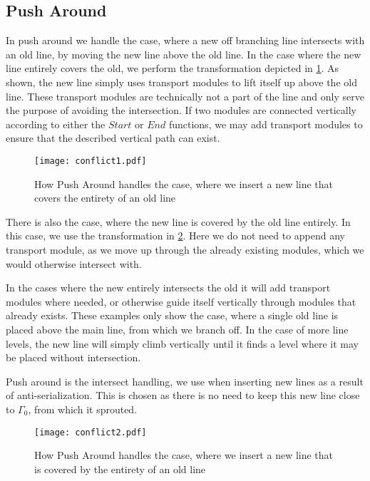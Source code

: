 \subsection{Push Around} \label{ssec:paround}
In push around we handle the case, where a new off branching line intersects with an old line, by moving the new line above the old line. In the case where the new line entirely covers the old, we perform the transformation depicted in \cref{fig:pusharound1}. As shown, the new line simply uses transport modules to lift itself up above the old line. These transport modules are technically not a part of the line and only serve the purpose of avoiding the intersection. If two modules are connected vertically according to either the $Start$ or $End$ functions, we may add transport modules to ensure that the described vertical path can exist.

\begin{figure}[h]
\centering
\texttt{[image: conflict1.pdf]}
\caption{How Push Around handles the case, where we insert a new line that covers the entirety of an old line}
\label{fig:pusharound1}
\end{figure}

There is also the case, where the new line is covered by the old line entirely. In this case, we use the transformation in \cref{fig:pusharound2}. Here we do not need to append any transport module, as we move up through the already existing modules, which we would otherwise intersect with. 

In the cases where the new entirely intersects the old it will add transport modules where needed, or otherwise guide itself vertically through modules that already exists. These examples only show the case, where a single old line is placed above the main line, from which we branch off. In the case of more line levels, the new line will simply climb vertically until it finds a level where it may be placed without intersection. 

Push around is the intersect handling, we use when inserting new lines as a result of anti-serialization. This is chosen as there is no need to keep this new line close to $\Gamma_0$, from which it sprouted. 

\begin{figure}[H]
\centering
\texttt{[image: conflict2.pdf]}
\caption{How Push Around handles the case, where we insert a new line that is covered by the entirety of an old line}
\label{fig:pusharound2}
\end{figure}

